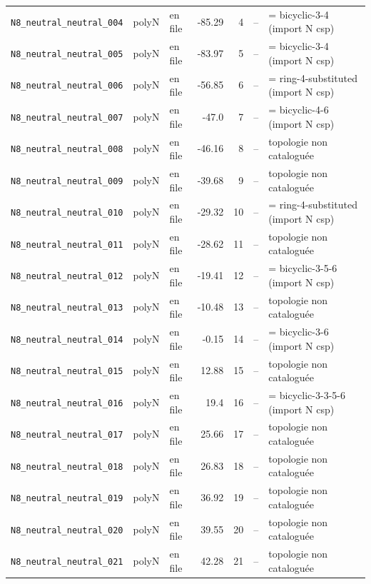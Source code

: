 \begin{longtable}{@{}p{4.2cm}cp{1.3cm}rrp{1.2cm}p{2.6cm}@{}}
\texttt{N8\_neutral\_neutral\_004} & polyN & en file & -85.29 & 4 & -- & = bicyclic-3-4 (import N csp) \\
\texttt{N8\_neutral\_neutral\_005} & polyN & en file & -83.97 & 5 & -- & = bicyclic-3-4 (import N csp) \\
\texttt{N8\_neutral\_neutral\_006} & polyN & en file & -56.85 & 6 & -- & = ring-4-substituted (import N csp) \\
\texttt{N8\_neutral\_neutral\_007} & polyN & en file & -47.0 & 7 & -- & = bicyclic-4-6 (import N csp) \\
\texttt{N8\_neutral\_neutral\_008} & polyN & en file & -46.16 & 8 & -- & topologie non catalogu\'ee \\
\texttt{N8\_neutral\_neutral\_009} & polyN & en file & -39.68 & 9 & -- & topologie non catalogu\'ee \\
\texttt{N8\_neutral\_neutral\_010} & polyN & en file & -29.32 & 10 & -- & = ring-4-substituted (import N csp) \\
\texttt{N8\_neutral\_neutral\_011} & polyN & en file & -28.62 & 11 & -- & topologie non catalogu\'ee \\
\texttt{N8\_neutral\_neutral\_012} & polyN & en file & -19.41 & 12 & -- & = bicyclic-3-5-6 (import N csp) \\
\texttt{N8\_neutral\_neutral\_013} & polyN & en file & -10.48 & 13 & -- & topologie non catalogu\'ee \\
\texttt{N8\_neutral\_neutral\_014} & polyN & en file & -0.15 & 14 & -- & = bicyclic-3-6 (import N csp) \\
\texttt{N8\_neutral\_neutral\_015} & polyN & en file & 12.88 & 15 & -- & topologie non catalogu\'ee \\
\texttt{N8\_neutral\_neutral\_016} & polyN & en file & 19.4 & 16 & -- & = bicyclic-3-3-5-6 (import N csp) \\
\texttt{N8\_neutral\_neutral\_017} & polyN & en file & 25.66 & 17 & -- & topologie non catalogu\'ee \\
\texttt{N8\_neutral\_neutral\_018} & polyN & en file & 26.83 & 18 & -- & topologie non catalogu\'ee \\
\texttt{N8\_neutral\_neutral\_019} & polyN & en file & 36.92 & 19 & -- & topologie non catalogu\'ee \\
\texttt{N8\_neutral\_neutral\_020} & polyN & en file & 39.55 & 20 & -- & topologie non catalogu\'ee \\
\texttt{N8\_neutral\_neutral\_021} & polyN & en file & 42.28 & 21 & -- & topologie non catalogu\'ee \\

\end{longtable}
